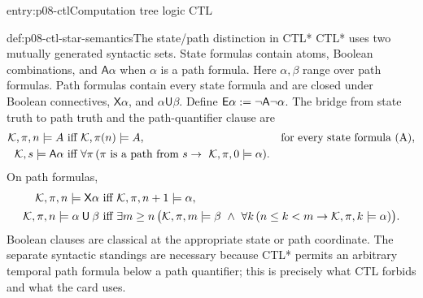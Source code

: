 \begin{systementry}{entry:p08-ctl}{Computation tree logic CTL}
\end{systementry}

\begin{hbdefinition}{def:p08-ctl-star-semantics}{The state/path distinction in CTL*}
CTL* uses two mutually generated syntactic sets.  State formulas contain atoms,
Boolean combinations, and \(\mathsf A\alpha\) when \(\alpha\) is a path
formula.  Here \(\alpha,\beta\) range over path formulas.  Path formulas
contain every state formula and are closed under Boolean connectives,
\(\mathsf X\alpha\), and \(\alpha\mathbin{\mathsf U}\beta\).  Define
\(\mathsf E\alpha\mathrel{:=}\neg\mathsf A\neg\alpha\).  The bridge from state
truth to path truth and the path-quantifier clause are
\[
 \begin{aligned}
  \mathcal K,\pi,n\models A
  &\text{ iff } \mathcal K,\pi(n)\models A,
  &&\text{for every state formula (A)},\\
  \mathcal K,s\models\mathsf A\alpha
  &\text{ iff }
    \forall\pi\,(\pi\text{ is a path from }s
      \to\ \mathcal K,\pi,0\models\alpha).
 \end{aligned}
\]
On path formulas,
\[
 \begin{aligned}
  \mathcal K,\pi,n\models\mathsf X\alpha
  &\text{ iff } \mathcal K,\pi,n+1\models\alpha,\\
  \mathcal K,\pi,n\models\alpha\mathbin{\mathsf U}\beta
  &\text{ iff }
    \exists m\ge n\,
      \bigl(\mathcal K,\pi,m\models\beta\ \land\
      \forall k\,(n\le k<m\to\mathcal K,\pi,k\models\alpha)\bigr).
 \end{aligned}
\]
Boolean clauses are classical at the appropriate state or path coordinate.
The separate syntactic standings are
necessary because CTL* permits an arbitrary temporal path formula below a path
quantifier; this is precisely what CTL forbids and what the card uses.
\end{hbdefinition}

